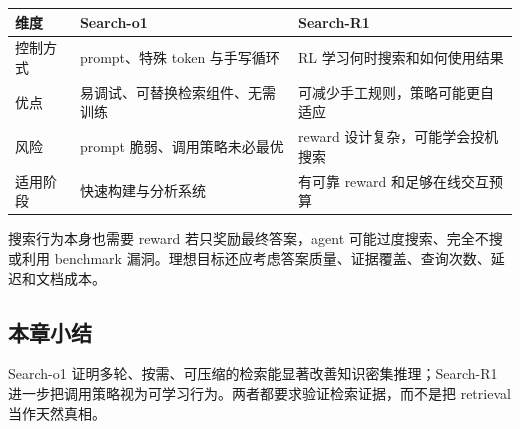 \begin{table}[H]
\centering
\small
\begin{tabular}{>{\raggedright\arraybackslash}p{3cm}>{\raggedright\arraybackslash}p{4.7cm}>{\raggedright\arraybackslash}p{4.7cm}}
\toprule
\textbf{维度} & \textbf{Search-o1} & \textbf{Search-R1} \\
\midrule
控制方式 & prompt、特殊 token 与手写循环 & RL 学习何时搜索和如何使用结果 \\
优点 & 易调试、可替换检索组件、无需训练 & 可减少手工规则，策略可能更自适应 \\
风险 & prompt 脆弱、调用策略未必最优 & reward 设计复杂，可能学会投机搜索 \\
适用阶段 & 快速构建与分析系统 & 有可靠 reward 和足够在线交互预算 \\
\bottomrule
\end{tabular}
\end{table}

\begin{importantbox}{搜索行为本身也需要 reward}
若只奖励最终答案，agent 可能过度搜索、完全不搜或利用 benchmark 漏洞。理想目标还应考虑答案质量、证据覆盖、查询次数、延迟和文档成本。
\end{importantbox}

\subsection{本章小结}

Search-o1 证明多轮、按需、可压缩的检索能显著改善知识密集推理；Search-R1 进一步把调用策略视为可学习行为。两者都要求验证检索证据，而不是把 retrieval 当作天然真相。

